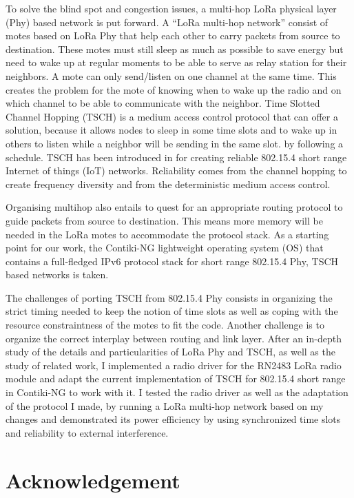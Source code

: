 \documentclass[11pt]{report}
\begin{document}
To solve the blind spot and congestion issues, a multi-hop LoRa
physical layer (Phy) based network is put forward.
A “LoRa multi-hop network” consist of motes based on LoRa Phy that help each
other to carry packets from source to destination.
These motes must still sleep as much as possible to save energy but need to
wake up at regular moments to be able to serve as relay station for their neighbors.
A mote can only send/listen on one channel at the same time.
This creates the problem for the mote of knowing when to wake up the radio and
on which channel to be able to communicate with the neighbor.
Time Slotted Channel Hopping (TSCH) is a medium access control protocol that
can offer a solution, because it allows nodes to sleep in some time slots and
to wake up in others to listen while a neighbor will be sending in the same slot.
by following a schedule.
TSCH has been introduced in for creating reliable 802.15.4 short range Internet of things (IoT) networks.
Reliability comes from the channel hopping to create frequency diversity and
from the deterministic medium access control.

Organising multihop also entails to quest for an appropriate routing protocol
to guide packets from source to destination.
This means more memory will be needed in the LoRa motes to accommodate the
protocol stack.
As a starting point for our work, the Contiki-NG lightweight operating system (OS)
that contains a full-fledged IPv6 protocol stack for short range 802.15.4 Phy,
TSCH based networks is taken.

The challenges of porting TSCH from 802.15.4 Phy consists in organizing the
strict timing needed to keep the notion of time slots as well as coping with
the resource constraintness of the motes to fit the code. Another challenge
is to organize the correct interplay between routing and link layer.
After an in-depth study of the details and particularities of LoRa Phy and TSCH,
as well as the study of related work,
I implemented a radio driver for the RN2483 LoRa radio module and adapt
the current implementation of TSCH for 802.15.4 short range in Contiki-NG to
work with it.
I tested the radio driver as well as the adaptation of the protocol I made, by running
a LoRa multi-hop network based on my changes and demonstrated its power efficiency
by using synchronized time slots and reliability to external interference.

\newpage

\section*{Acknowledgement}
\end{document}
